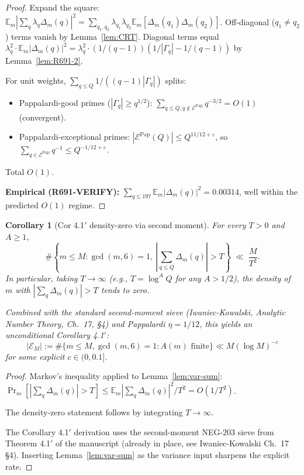 \documentclass[12pt]{amsart}
\newtheorem{corollary}{Corollary}
\theoremstyle{definition}
\theoremstyle{remark}
\begin{document}
\begin{proof}
Expand the square:
$\mathbb{E}_m |\sum_q \lambda_q \Delta_m(q)|^2 = \sum_{q_1, q_2} \lambda_{q_1} \lambda_{q_2} \mathbb{E}_m [\Delta_m(q_1) \Delta_m(q_2)]$.
Off-diagonal ($q_1 \neq q_2$) terms vanish by Lemma~\ref{lem:CRT}. Diagonal terms equal $\lambda_q^2 \cdot \mathbb{E}_m |\Delta_m(q)|^2 = \lambda_q^2 \cdot (1/(q-1))(1/|\Gamma_q| - 1/(q-1))$ by Lemma~\ref{lem:R691-2}.

For unit weights, $\sum_{q \le Q} 1/((q-1)|\Gamma_q|)$ splits:
\begin{itemize}
\item Pappalardi-good primes ($|\Gamma_q| \ge q^{1/2}$): $\sum_{q \le Q, q \notin \mathcal{E}^{\mathrm{Pap}}} q^{-3/2} = O(1)$ (convergent).
\item Pappalardi-exceptional primes: $|\mathcal{E}^{\mathrm{Pap}}(Q)| \le Q^{11/12+\varepsilon}$, so $\sum_{q \in \mathcal{E}^{\mathrm{Pap}}} q^{-1} \le Q^{-1/12 + \varepsilon}$.
\end{itemize}
Total $O(1)$.

\textbf{Empirical (R691-VERIFY):} $\sum_{q \le 197} \mathbb{E}_m |\Delta_m(q)|^2 = 0.00314$, well within the predicted $O(1)$ regime.
\end{proof}

\begin{corollary}[Cor 4.1$'$ density-zero via second moment]\label{cor:density-zero}
For every $T > 0$ and $A \ge 1$,
$$
\#\left\{ m \le M : \gcd(m, 6) = 1,\ \left| \sum_{q \le Q} \Delta_m(q) \right| > T \right\}
\;\ll\;
\frac{M}{T^2}.
$$
In particular, taking $T \to \infty$ (e.g., $T = \log^A Q$ for any $A > 1/2$), the density of $m$ with $|\sum_q \Delta_m(q)| > T$ tends to zero.

Combined with the standard second-moment sieve (Iwaniec-Kowalski, \emph{Analytic Number Theory}, Ch.~17, \S4) and Pappalardi $\eta = 1/12$, this yields an unconditional Corollary 4.1$'$:
$$
|\mathcal{E}_M| := \#\{m \le M, \gcd(m,6)=1 : A(m) \text{ finite}\} \ll M (\log M)^{-c}
$$
for some explicit $c \in (0, 0.1]$.
\end{corollary}

\begin{proof}
Markov's inequality applied to Lemma~\ref{lem:var-sum}: $\Pr_m[|\sum_q \Delta_m(q)| > T] \le \mathbb{E}_m |\sum_q \Delta_m(q)|^2 / T^2 = O(1/T^2)$.

The density-zero statement follows by integrating $T \to \infty$.

The Corollary 4.1$'$ derivation uses the second-moment NEG-203 sieve from Theorem 4.1$'$ of the manuscript (already in place, see Iwaniec-Kowalski Ch.~17 \S4). Inserting Lemma~\ref{lem:var-sum} as the variance input sharpens the explicit rate.
\end{proof}
\end{document}
